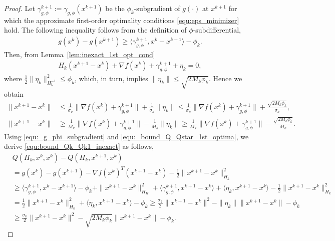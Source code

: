\documentclass[11pt]{article}
\numberwithin{equation}{section}
\begin{document}
\begin{proof}
	Let $\gamma_{g, \phi}^{k+1}:=\gamma_{g, \phi}(x^{k+1})$ be the $\phi_k$-subgradient of $g(\cdot)$ at $x^{k+1}$
	for which the approximate first-order optimality conditions  \eqref{equ:eps_minimizer} hold. 
	The following inequality follows from the definition of $\phi$-subdifferential,
	\begin{align}
        \label{equ:_g_phi_subgradient}
        g(x^k) - g(x^{k+1}) 
        \geq 
        \langle \gamma_{g, \phi}^{k+1}, x^k-x^{k+1} \rangle - \phi_k. 
    \end{align}
	Then, from Lemma~\ref{lem:inexact_1st_opt_cond} 
    \begin{align}
        \label{equ:_bound_Q_Qstar_1st_optima}
        H_k(x^{k+1}-x^k) + \nabla f(x^k) + \gamma_{g, \phi}^{k+1}+\eta_k= 0,
    \end{align}
    where $\frac{1}{2}\|\eta_k\|^2_{H_k^{-1}}\leq \phi_k$, which, in turn, implies $\|\eta_k\| \leq \sqrt{2M_k\phi_k}$. Hence we obtain
    \begin{align*}
		\| x^{k+1} - x^k\|
		&\leq  \frac{1}{\sigma_k}\|  \nabla f(x^k) + \gamma_{g, \phi}^{k+1} \| + \frac{1}{\sigma_k}\|\eta_k\|
		\leq  
		\frac{1}{\sigma_k}\|  \nabla f(x^k) + \gamma_{g, \phi}^{k+1} \| + \frac{\sqrt{2M_k\phi_k}}{\sigma_k}, \\
		\| x^{k+1} - x^k\|
		&\geq   \frac{1}{M_k}\|  \nabla f(x^k) + \gamma_{g, \phi}^{k+1} \|-   \frac{1}{M_k}\|\eta_k\|
		\geq   
		\frac{1}{M_k}\|  \nabla f(x^k) + \gamma_{g, \phi}^{k+1} \|- \frac{\sqrt{2M_k\phi_k}}{M_k}.
	\end{align*}
	Using \eqref{equ:_g_phi_subgradient} and \eqref{equ:_bound_Q_Qstar_1st_optima}, we derive \eqref{equ:bound_Qk_Qk1_inexact} as follows,
	\begin{align*}
	        &Q(H_k,x^k,x^k) - Q(H_k,x^{k+1}, x^k) \\
	        &= g(x^k) - g(x^{k+1}) 
	        - \nabla f(x^k)^T( x^{k+1}-x^k)  
	        - \frac{1}{2}\|x^{k+1}-x^k\|^2_{H_k}  \\
	        &\geq \langle \gamma_{g, \phi}^{k+1}, x^{k}-x^{k+1} \rangle 
	        - \phi_k
	        + \|x^{k+1}-x^k\|_{H_K}^2 
	        +  \langle \gamma_{g, \phi}^{k+1}, x^{k+1} - x^{k}\rangle
	        + \langle \eta_k, x^{k+1}-x^k \rangle
	        - \frac{1}{2}\|x^{k+1}-x^k\|^2_{H_k} \\
			&= \frac{1}{2}\|x^{k+1}-x^k\|^2_{H_k} 
			+ \langle \eta_k,  x^{k+1}-x^k \rangle - \phi_k
			\geq \frac{\sigma_k}{2}\|x^{k+1}-x^k\|^2
			- \|\eta_k\|\|x^{k+1}-x^k\| - \phi_k  \\
	        &\geq \frac{\sigma_k}{2}\|x^{k+1}-x^k\|^2-\sqrt{2M_k\phi_k}\|x^{k+1}-x^k\| - \phi_k.
	\end{align*}
\end{proof}
\end{document}
